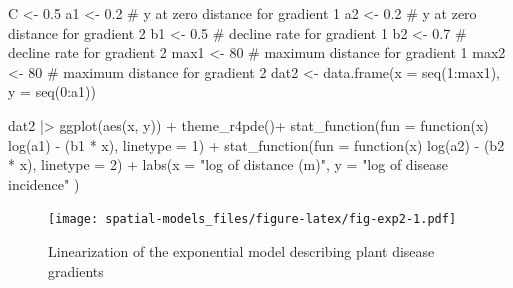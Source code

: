 \documentclass[
  letterpaper,
]{book}
\newenvironment{Shaded}{\begin{snugshade}}{\end{snugshade}}
\newcommand{\AttributeTok}[1]{\textcolor[rgb]{0.40,0.45,0.13}{#1}}
\newcommand{\CommentTok}[1]{\textcolor[rgb]{0.37,0.37,0.37}{#1}}
\newcommand{\ControlFlowTok}[1]{\textcolor[rgb]{0.00,0.23,0.31}{#1}}
\newcommand{\DecValTok}[1]{\textcolor[rgb]{0.68,0.00,0.00}{#1}}
\newcommand{\FloatTok}[1]{\textcolor[rgb]{0.68,0.00,0.00}{#1}}
\newcommand{\FunctionTok}[1]{\textcolor[rgb]{0.28,0.35,0.67}{#1}}
\newcommand{\NormalTok}[1]{\textcolor[rgb]{0.00,0.23,0.31}{#1}}
\newcommand{\OtherTok}[1]{\textcolor[rgb]{0.00,0.23,0.31}{#1}}
\newcommand{\SpecialCharTok}[1]{\textcolor[rgb]{0.37,0.37,0.37}{#1}}
\newcommand{\StringTok}[1]{\textcolor[rgb]{0.13,0.47,0.30}{#1}}
\begin{document}
\begin{Shaded}
\begin{Highlighting}[]
\NormalTok{C }\OtherTok{\textless{}{-}} \FloatTok{0.5}
\NormalTok{a1 }\OtherTok{\textless{}{-}} \FloatTok{0.2} \CommentTok{\# y at zero distance for gradient 1}
\NormalTok{a2 }\OtherTok{\textless{}{-}} \FloatTok{0.2} \CommentTok{\# y at zero distance for gradient 2}
\NormalTok{b1 }\OtherTok{\textless{}{-}} \FloatTok{0.5} \CommentTok{\# decline rate for gradient 1}
\NormalTok{b2 }\OtherTok{\textless{}{-}} \FloatTok{0.7} \CommentTok{\# decline rate for gradient 2}
\NormalTok{max1 }\OtherTok{\textless{}{-}} \DecValTok{80} \CommentTok{\# maximum distance for gradient 1}
\NormalTok{max2 }\OtherTok{\textless{}{-}} \DecValTok{80} \CommentTok{\# maximum distance for gradient 2}
\NormalTok{dat2 }\OtherTok{\textless{}{-}} \FunctionTok{data.frame}\NormalTok{(}\AttributeTok{x =} \FunctionTok{seq}\NormalTok{(}\DecValTok{1}\SpecialCharTok{:}\NormalTok{max1), }\AttributeTok{y =} \FunctionTok{seq}\NormalTok{(}\DecValTok{0}\SpecialCharTok{:}\NormalTok{a1))}

\NormalTok{dat2 }\SpecialCharTok{|\textgreater{}}
  \FunctionTok{ggplot}\NormalTok{(}\FunctionTok{aes}\NormalTok{(x, y)) }\SpecialCharTok{+}
  \FunctionTok{theme\_r4pde}\NormalTok{()}\SpecialCharTok{+}
  \FunctionTok{stat\_function}\NormalTok{(}\AttributeTok{fun =} \ControlFlowTok{function}\NormalTok{(x) }\FunctionTok{log}\NormalTok{(a1) }\SpecialCharTok{{-}}\NormalTok{ (b1 }\SpecialCharTok{*}\NormalTok{ x), }\AttributeTok{linetype =} \DecValTok{1}\NormalTok{) }\SpecialCharTok{+}
  \FunctionTok{stat\_function}\NormalTok{(}\AttributeTok{fun =} \ControlFlowTok{function}\NormalTok{(x) }\FunctionTok{log}\NormalTok{(a2) }\SpecialCharTok{{-}}\NormalTok{ (b2 }\SpecialCharTok{*}\NormalTok{ x), }\AttributeTok{linetype =} \DecValTok{2}\NormalTok{) }\SpecialCharTok{+}
  \FunctionTok{labs}\NormalTok{(}\AttributeTok{x =} \StringTok{"log of distance (m)"}\NormalTok{, }\AttributeTok{y =} \StringTok{"log of disease incidence"}
\NormalTok{  )}
\end{Highlighting}
\end{Shaded}

\begin{figure}

{\centering \texttt{[image: spatial-models\_files/figure-latex/fig-exp2-1.pdf]}

}

\caption{\label{fig-exp2}Linearization of the exponential model
describing plant disease gradients}

\end{figure}
\end{document}
